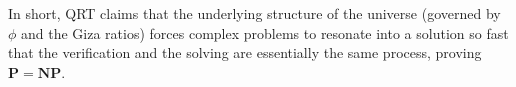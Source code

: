 \documentclass[12pt]{article}
\begin{document}
In short, QRT claims that the underlying structure of the universe (governed by $\phi$ and the Giza ratios) forces complex problems to resonate into a solution so fast that the verification and the solving are essentially the same process, proving $\mathbf{P = NP}$.


\end{document}
